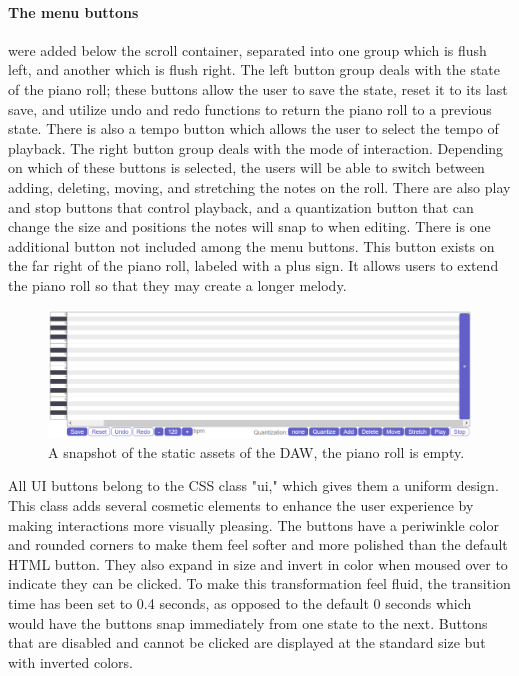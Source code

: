 \paragraph{The menu buttons} were added below the scroll container, separated into one group which is flush
left, and another which is flush right. The left button group deals with the state of the piano
roll; these buttons allow the user to save the state, reset it to its last save, and utilize undo and
redo functions to return the piano roll to a previous state. There is also a tempo button which
allows the user to select the tempo of playback. The right button group deals with the mode of
interaction. Depending on which of these buttons is selected, the users will be able to switch
between adding, deleting, moving, and stretching the notes on the roll. There are also play and
stop buttons that control playback, and a quantization button that can change the size and
positions the notes will snap to when editing. There is one additional button not included among
the menu buttons. This button exists on the far right of the piano roll, labeled with a plus sign.
It allows users to extend the piano roll so that they may create a longer melody.

\begin{figure}[h!]
  \centering
  \includegraphics[width=\linewidth]{image/Static.png}
  \caption{A snapshot of the static assets of the DAW, the piano roll is empty.}
  \label{fig:static}
\end{figure}

All UI buttons belong to the CSS class "ui," which gives them a uniform design. This class adds
several cosmetic elements to enhance the user experience by making interactions more visually
pleasing. The buttons have a periwinkle color and rounded corners to make them feel softer and
more polished than the default HTML button. They also expand in size and invert in color when
moused over to indicate they can be clicked. To make this transformation feel fluid, the transition
time has been set to 0.4 seconds, as opposed to the default 0 seconds which would have the buttons
snap immediately from one state to the next. Buttons that are disabled and cannot be clicked are
displayed at the standard size but with inverted colors.

